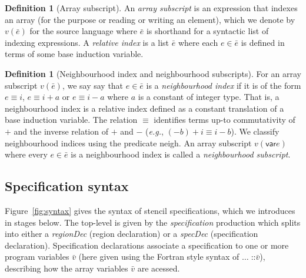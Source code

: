 \documentclass[9pt]{sigplanconf}
\newcounter{block}
\theoremstyle{definition}
\newtheorem{definition}[block]{Definition}
\newcommand{\eg}{\emph{e.g.}}
\newcommand{\nonterm}[1]{\textit{#1}}
\newcommand{\neigh}{\textsf{neigh}}
\newcommand{\var}{\textsf{var}}
\begin{document}
\begin{definition}[Array subscript]
  An \emph{array subscript} is an expression that indexes an array
  (for the purpose or reading or writing an element), which we denote
  by $v(\bar{e})$ for the source language where $\bar{e}$ is shorthand
  for a syntactic list of indexing expressions. A \emph{relative
    index} is a list $\bar{e}$ where each $e \in \bar{e}$ is defined
  in terms of some base induction variable.
\end{definition}

\begin{definition}[Neighbourhood index and neighbourhood subscripts]
  For an array subscript $v(\bar{e})$, we say say that $e \in \bar{e}$
  is a \emph{neighbourhood index} if it is of the form 
  $e \equiv i$, $e \equiv i + a$ or $e \equiv i - a$ where $a$ is a
  constant of integer type. That is, a neighbourhood index is a
  relative index defined as a constant translation of a base induction
  variable. The relation $\equiv$ identifies terms up-to commutativity
  of $+$ and the inverse relation of $+$ and $-$ (\eg{},
  $(-b) + i \equiv i - b$).  We classify neighbourhood indices using
  the predicate \neigh{}. An array subscript $v(\var{e})$ where every
 $e \in \bar{e}$ is a neighbourhood index is called a 
 \emph{neighbourhood subscript}. 
\end{definition}


\subsection{Specification syntax}
\label{sec:syntax}

Figure~\ref{fig:syntax} gives the syntax of stencil specifications,
which we introduces in stages below.  The top-level is given by the
\nonterm{specification} production which splits into either a
\nonterm{regionDec} (region declaration) or a \nonterm{specDec}
(specification declaration). Specification declarations associate a
specification to one or more program variables $\bar{v}$ (here given
using the Fortran style syntax of $\ldots \; \texttt{::} \bar{v}$),
describing how the array variables $\bar{v}$ are acessed.

\end{document}
